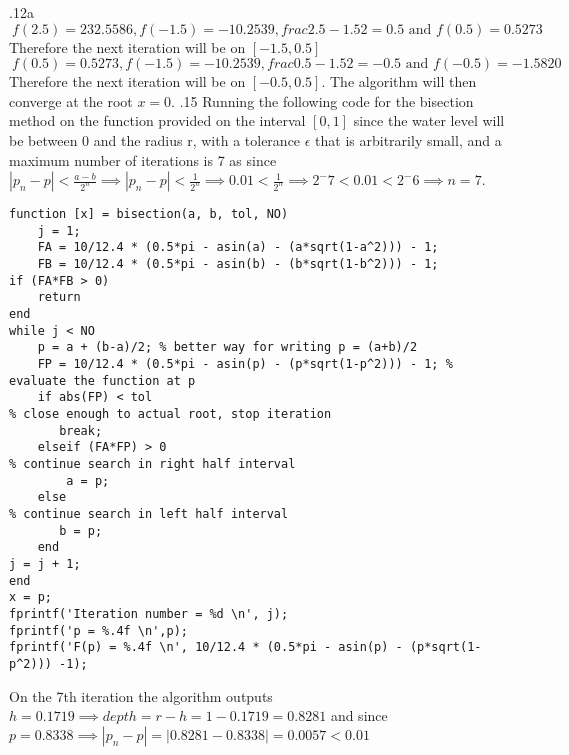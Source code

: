 \documentclass[11pt]{exam}
\theoremstyle{plain}
\theoremstyle{definition}\newtheorem{definition}[theorem]{Definition}
\theoremstyle{definition}\newtheorem*{definition*}{Definition}
\begin{document}
\begin{questions}
.12a 
\[\ f(2.5) =  232.5586, f(-1.5) = -10.2539, frac{2.5 - 1.5}{2} = 0.5 \text{ and  } f(0.5) = 0.5273\]
Therefore the next iteration will be on $[-1.5, 0.5]$
\[\ f(0.5) =  0.5273, f(-1.5) = -10.2539, frac{0.5 - 1.5}{2} = -0.5 \text{ and  } f(-0.5) = -1.5820\]
Therefore the next iteration will be on $[-0.5, 0.5]$. The algorithm will then converge at the root $x =0$.
.15 
Running the following code for the bisection method on the function provided on the interval $[0,1]$ since the water level will be between 0 and the radius r, with a tolerance $\epsilon$ that is arbitrarily small, and a maximum number of iterations is 7 as  since $|p_n - p| < \frac{a - b}{2^n} \implies |p_n - p| < \frac{1}{2^n} \implies 0.01 < \frac{1}{2^n} \implies 2^-7 < 0.01 < 2^-6 \implies n = 7$. 
\begin{lstlisting}[style=Matlab-editor]
function [x] = bisection(a, b, tol, NO)
    j = 1;
    FA = 10/12.4 * (0.5*pi - asin(a) - (a*sqrt(1-a^2))) - 1;
    FB = 10/12.4 * (0.5*pi - asin(b) - (b*sqrt(1-b^2))) - 1;
if (FA*FB > 0)
    return
end
while j < NO
    p = a + (b-a)/2; % better way for writing p = (a+b)/2
    FP = 10/12.4 * (0.5*pi - asin(p) - (p*sqrt(1-p^2))) - 1; % evaluate the function at p
    if abs(FP) < tol
% close enough to actual root, stop iteration
       break;
    elseif (FA*FP) > 0
% continue search in right half interval
        a = p;
    else
% continue search in left half interval
       b = p;
    end
j = j + 1;
end
x = p;
fprintf('Iteration number = %d \n', j);
fprintf('p = %.4f \n',p);
fprintf('F(p) = %.4f \n', 10/12.4 * (0.5*pi - asin(p) - (p*sqrt(1-p^2))) -1);
\end{lstlisting}
On the 7th iteration the algorithm outputs $h = 0.1719 \implies depth = r - h = 1 - 0.1719 = 0.8281$ and since $ p = 0.8338 \implies |p_n - p| = |0.8281 - 0.8338| = 0.0057 < 0.01$ 


\end{questions}
\end{document}
